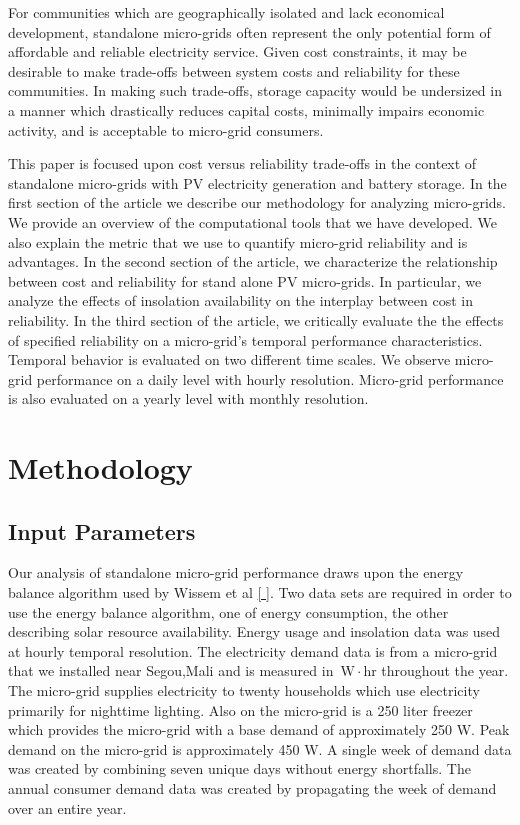 \documentclass{article}
\newcommand{\unit}[1]{\ensuremath{\, \mathrm{#1}}}
\begin{document}
For communities which are geographically isolated and lack economical development, standalone micro-grids often represent the only potential form of affordable and reliable electricity service. 
Given cost constraints, it may be desirable to make trade-offs between system costs and reliability for these communities. 
In making such trade-offs, storage capacity would be undersized in a manner which 
drastically %
reduces capital costs, minimally impairs economic activity, and is acceptable to micro-grid consumers. 

This paper is focused upon cost versus reliability trade-offs in
the context of standalone micro-grids with PV electricity generation
and battery storage. 
In the first section of the article we describe our methodology 
for analyzing micro-grids. 
We provide an overview of the computational tools that we have developed.
We also explain the metric that we use to quantify micro-grid reliability
and is advantages.
In the second section of the article, we characterize the relationship 
between cost and reliability for stand alone PV micro-grids. 
In particular, we analyze the effects of insolation availability on 
the interplay between cost in reliability. 
In the third section of the article, we critically evaluate the 
the effects of specified reliability on a micro-grid's temporal performance 
characteristics. 
Temporal behavior is evaluated on two different time scales. 
We observe micro-grid performance on a daily level with hourly resolution. 
Micro-grid performance is also evaluated on a yearly level 
with monthly resolution. 

\section{Methodology}
\subsection{Input Parameters}
Our analysis of standalone micro-grid performance draws upon the energy balance algorithm used by Wissem et al \ref{ }. 
Two data sets are required in order to use the energy balance algorithm, one of energy consumption, the other describing solar resource availability.
Energy usage and insolation data was used at hourly temporal resolution. 
%
The electricity demand data is from a micro-grid that we installed near Segou,Mali and is measured in {\unit{W\!\cdot \! hr}} throughout the year. 
The micro-grid supplies electricity to twenty households which use electricity primarily for nighttime lighting.
Also on the micro-grid is a 250 liter freezer which provides the micro-grid with a base demand of approximately 250 W. 
Peak demand on the micro-grid is approximately 450 W. 
A single week of demand data was created by combining seven unique days without energy shortfalls. 
The annual consumer demand data was created by propagating the week of demand over an entire year.
\end{document}
